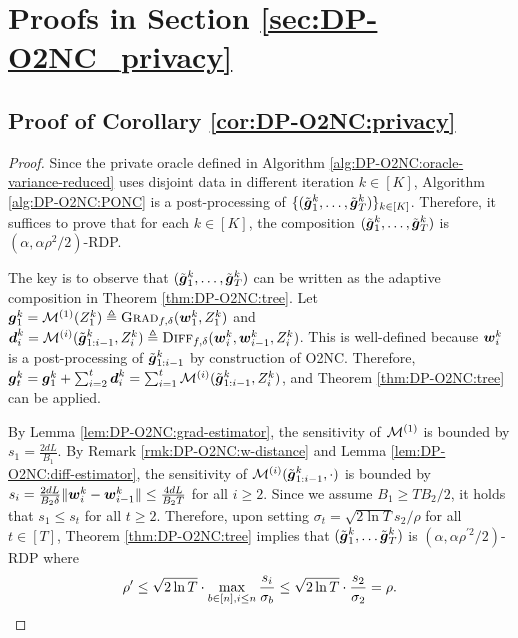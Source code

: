 \section{Proofs in Section \ref{sec:DP-O2NC_privacy}}

\subsection{Proof of Corollary \ref{cor:DP-O2NC:privacy}}


\begin{proof}
Since the private oracle defined in Algorithm \ref{alg:DP-O2NC:oracle-variance-reduced} uses disjoint data in different iteration $k\in[K]$, Algorithm \ref{alg:DP-O2NC:PONC} is a post-processing of $\{(\tilde{{\boldsymbol{g}}}_1^k,\ldots,\tilde{{\boldsymbol{g}}}_T^k)\}_{k\in[K]}$. Therefore, it suffices to prove that for each $k\in[K]$, the composition $(\tilde{{\boldsymbol{g}}}_1^k,\ldots,\tilde {{\boldsymbol{g}}}_T^k)$ is $(\alpha,\alpha\rho^2/2)$-RDP.

The key is to observe that $(\tilde{{\boldsymbol{g}}}_1^k,\ldots,\tilde{{\boldsymbol{g}}}_T^k)$ can be written as the adaptive composition in Theorem \ref{thm:DP-O2NC:tree}. Let ${\boldsymbol{g}}_1^k = {\cal M}^{(1)}(Z_1^k) \triangleq {\normalfont\textsc{Grad}}_{f,\delta}({\boldsymbol{w}}_1^k,Z_1^k)$ and ${\boldsymbol{d}}_i^k = {\cal M}^{(i)}(\tilde{{\boldsymbol{g}}}_{1:i-1}^k, Z_i^k) \triangleq {\normalfont\textsc{Diff}}_{f,\delta}({\boldsymbol{w}}_i^k,{\boldsymbol{w}}_{i-1}^k,Z_i^k)$. This is well-defined because 
${\boldsymbol{w}}_i^k$ is a post-processing of $\tilde{{\boldsymbol{g}}}_{1:i-1}^k$ by construction of O2NC. Therefore, ${\boldsymbol{g}}_t^k={\boldsymbol{g}}_1^k+\sum_{i=2}^t {\boldsymbol{d}}_i^k = \sum_{i=1}^t {\cal M}^{(i)}(\tilde{{\boldsymbol{g}}}_{1:i-1}^k,Z_i^k)$, and Theorem \ref{thm:DP-O2NC:tree} can be applied.

By Lemma \ref{lem:DP-O2NC:grad-estimator}, the sensitivity of ${\cal M}^{(1)}$ is bounded by $s_1 = \frac{2dL}{B_1}$. By Remark \ref{rmk:DP-O2NC:w-distance} and Lemma \ref{lem:DP-O2NC:diff-estimator}, the sensitivity of ${\cal M}^{(i)}(\tilde{{\boldsymbol{g}}}_{1:i-1}^k,\cdot)$ is bounded by $s_i=\frac{2dL}{B_2\delta}\|{\boldsymbol{w}}_i^k-{\boldsymbol{w}}_{i-1}^k\| \le \frac{4dL}{B_2T}$ for all $i\ge 2$.
Since we assume $B_1\ge TB_2/2$, it holds that $s_1\le s_t$ for all $t\ge 2$. Therefore, upon setting $\sigma_t = {\sqrt{2\ln T}s_2}/{\rho}$ for all $t\in[T]$, Theorem \ref{thm:DP-O2NC:tree} implies that $(\tilde{{\boldsymbol{g}}}_1^k,\ldots\tilde{{\boldsymbol{g}}}_T^k)$ is $(\alpha,\alpha\rho^{\prime 2}/2)$-RDP where
\begin{equation*}
    \rho' \le \sqrt{2\ln T} \cdot \max_{b\in[n], i\le n} \frac{s_i}{\sigma_b} \le \sqrt{2\ln T} \cdot \frac{s_2}{\sigma_2} = \rho.
    \qedhere
\end{equation*}
\end{proof}


